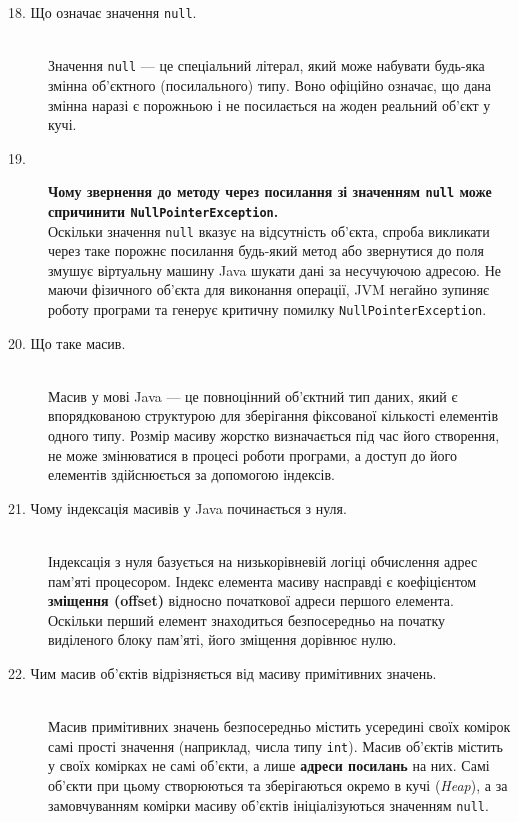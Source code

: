 \begin{description}
    \item[18. Що означає значення \texttt{null}.] ~\\
    Значення \texttt{null} — це спеціальний літерал, який може набувати будь-яка змінна об'єктного (посилального) типу. Воно офіційно означає, що дана змінна наразі є порожньою і не посилається на жоден реальний об'єкт у кучі.

    \item[19.] \textbf{Чому звернення до методу через посилання зі значенням \texttt{null} може спричинити \texttt{NullPointerException}.} ~\\
    Оскільки значення \texttt{null} вказує на відсутність об'єкта, спроба викликати через таке порожнє посилання будь-який метод або звернутися до поля змушує віртуальну машину Java шукати дані за несучуючою адресою. Не маючи фізичного об'єкта для виконання операції, JVM негайно зупиняє роботу програми та генерує критичну помилку \texttt{NullPointerException}.

    \item[20. Що таке масив.] ~\\
    Масив у мові Java — це повноцінний об'єктний тип даних, який є впорядкованою структурою для зберігання фіксованої кількості елементів одного типу. Розмір масиву жорстко визначається під час його створення, не може змінюватися в процесі роботи програми, а доступ до його елементів здійснюється за допомогою індексів.
    
    \item[21. Чому індексація масивів у Java починається з нуля.] ~\\
    Індексація з нуля базується на низькорівневій логіці обчислення адрес пам'яті процесором. Індекс елемента масиву насправді є коефіцієнтом \textbf{зміщення (offset)} відносно початкової адреси першого елемента. Оскільки перший елемент знаходиться безпосередньо на початку виділеного блоку пам'яті, його зміщення дорівнює нулю.

    \item[22. Чим масив об'єктів відрізняється від масиву примітивних значень.] ~\\
    Масив примітивних значень безпосередньо містить усередині своїх комірок самі прості значення (наприклад, числа типу \texttt{int}). Масив об'єктів містить у своїх комірках не самі об'єкти, а лише \textbf{адреси посилань} на них. Самі об'єкти при цьому створюються та зберігаються окремо в кучі (\textit{Heap}), а за замовчуванням комірки масиву об'єктів ініціалізуються значенням \texttt{null}.


\end{description}

